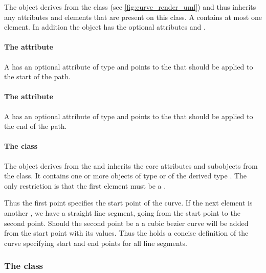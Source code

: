 The \RenderCurve object derives from the \GraphicalPrimitiveOneD class (see \ref{fig:curve_render_uml})
and thus inherits any attributes and elements that are present on this
class.
A \RenderCurve contains at most one \ListOfElements element.
In addition the \RenderCurve object has the optional attributes  and .

\paragraph{The \fixttspace{} attribute}

A \RenderCurve has an optional attribute  of type
 and points to the \LineEnding that should be applied to the start of the path.

\paragraph{The \fixttspace{} attribute}

A \RenderCurve has an optional attribute  of type
 and points to the \LineEnding that should be applied to the end of the path.

\paragraph{The  class}
\label{listofelements-class}

The \ListOfElements object derives from the  and inherits
the core attributes and subobjects from the  class. It
contains one or more objects of type \RenderPoint or of the derived type \RenderCubicBezier. 
The only restriction is that the first element must be a \RenderPoint.

Thus the first point specifies the start point of the curve. If the next element 
is another \RenderPoint, we have a straight line segment, going from the start point 
to the second point. Should the second point be a \RenderCubicBezier a cubic bezier curve 
will be added from the start point with its values. Thus the \ListOfElements holds a concise
definition of the curve specifying start and end points for all line segments. 


\subsubsection{The  class}
\label{renderpoint-class}

